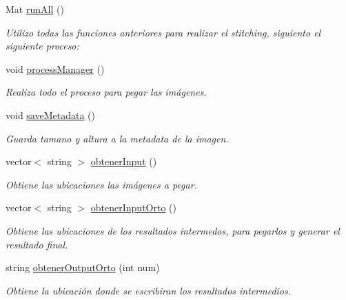 \begin{DoxyCompactItemize}
Mat \mbox{\hyperlink{classuav_1_1Stitcher_a0b78aba00328166db74d46884485f3bd}{run\+All}} ()
\begin{DoxyCompactList}\small\item\em Utilizo todas las funciones anteriores para realizar el stitching, siguiento el siguiente proceso\+: \end{DoxyCompactList}\item 
\mbox{\label{classuav_1_1Stitcher_ac4616d6a6ed8e7aaf7b41464ed4b85d8}} 
void \mbox{\hyperlink{classuav_1_1Stitcher_ac4616d6a6ed8e7aaf7b41464ed4b85d8}{process\+Manager}} ()
\begin{DoxyCompactList}\small\item\em Realiza todo el proceso para pegar las imágenes. \end{DoxyCompactList}\item 
\mbox{\label{classuav_1_1Stitcher_a2ae32d1779c883faaf90253eb0b2fd51}} 
void \mbox{\hyperlink{classuav_1_1Stitcher_a2ae32d1779c883faaf90253eb0b2fd51}{save\+Metadata}} ()
\begin{DoxyCompactList}\small\item\em Guarda tamano y altura a la metadata de la imagen. \end{DoxyCompactList}\item 
vector$<$ string $>$ \mbox{\hyperlink{classuav_1_1Stitcher_a33521f40ecd0a4b57e3433b32c33f872}{obtener\+Input}} ()
\begin{DoxyCompactList}\small\item\em Obtiene las ubicaciones las imágenes a pegar. \end{DoxyCompactList}\item 
vector$<$ string $>$ \mbox{\hyperlink{classuav_1_1Stitcher_a4a31cc35b3bc69697cdaa8094d4490b8}{obtener\+Input\+Orto}} ()
\begin{DoxyCompactList}\small\item\em Obtiene las ubicaciones de los resultados intermedos, para pegarlos y generar el resultado final. \end{DoxyCompactList}\item 
string \mbox{\hyperlink{classuav_1_1Stitcher_a2f5433b17c42c874359f7f92148b4ee2}{obtener\+Output\+Orto}} (int num)
\begin{DoxyCompactList}\small\item\em Obtiene la ubicación donde se escribiran los resultados intermedios. \end{DoxyCompactList}\item 

\end{DoxyCompactItemize}
